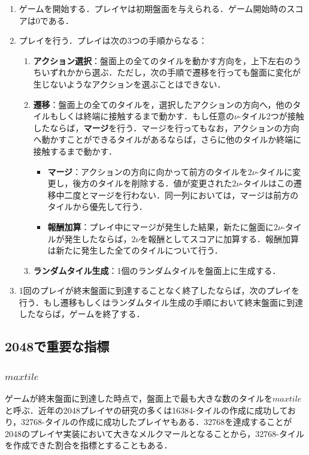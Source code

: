 \documentclass{suribt}
\begin{document}
\begin{enumerate}
\item ゲームを開始する．プレイヤは初期盤面を与えられる．ゲーム開始時のスコアは0である．
\item プレイを行う．プレイは次の3つの手順からなる：
	\begin{enumerate}
	\item \textbf{アクション選択}：盤面上の全てのタイルを動かす方向を，上下左右のうちいずれかから選ぶ．ただし，次の手順で遷移を行っても盤面に変化が生じないようなアクションを選ぶことはできない．
	\item \textbf{遷移}：盤面上の全てのタイルを，選択したアクションの方向へ，他のタイルもしくは終端に接触するまで動かす．もし任意の${\nu}$-タイル2つが接触したならば，\textbf{マージ}を行う．マージを行ってもなお，アクションの方向へ動かすことができるタイルがあるならば，さらに他のタイルか終端に接触するまで動かす．
	\begin{itemize}
		\item \textbf{マージ}：アクションの方向に向かって前方のタイルを$2{\nu}$-タイルに変更し，後方のタイルを削除する．値が変更された$2{\nu}$-タイルはこの遷移中二度とマージを行わない．同一列においては，マージは前方のタイルから優先して行う．
		\item \textbf{報酬加算}：プレイ中にマージが発生した結果，新たに盤面に$2{\nu}$-タイルが発生したならば，$2{\nu}$を報酬としてスコアに加算する．報酬加算は新たに発生した全てのタイルについて行う．
	\end{itemize}
	\item \textbf{ランダムタイル生成}：1個のランダムタイルを盤面上に生成する．
	\end{enumerate}
\item 1回のプレイが終末盤面に到達することなく終了したならば，次のプレイを行う．もし遷移もしくはランダムタイル生成の手順において終末盤面に到達したならば，ゲームを終了する．
\end{enumerate}

\subsection{2048で重要な指標}
\subsubsection{$max tile$}
ゲームが終末盤面に到達した時点で，盤面上で最も大きな数のタイルを$max tile$と呼ぶ．近年の2048プレイヤの研究の多くは16384-タイルの作成に成功しており，32768-タイルの作成に成功したプレイヤもある．32768を達成することが2048のプレイヤ実装において大きなメルクマールとなることから，32768-タイルを作成できた割合を指標とすることもある．
\end{document}
